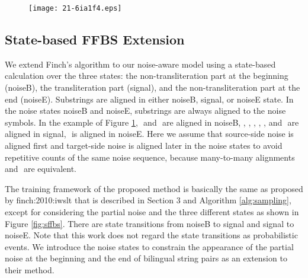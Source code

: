 \documentclass[english]{jnlp_1.4}
\def\subpair#1#2{}
\newcommand{\newcite}{}
\begin{document}
\begin{figure}[t]
\begin{center}
\texttt{[image: 21-6ia1f4.eps]}
\end{center}
\label{fig:alignment}
\end{figure}


\subsection{State-based FFBS Extension}

We extend Finch's algorithm to our noise-aware model
using a state-based calculation over the three states:
the non-transliteration part at the beginning ({\sf noiseB}),
the transliteration part ({\sf signal}),
and the non-transliteration part at the end ({\sf noiseE}).
Substrings are aligned in either {\sf noiseB}, {\sf signal}, or {\sf noiseE} state.
In the noise states {\sf noiseB} and {\sf noiseE}, substrings are always aligned to the noise symbols.
In the example of Figure {\ref{fig:alignment}},
{$\subpair{\mathit{noise}}{\text{the}}$} and {$\subpair{\mathit{noise}}{\mathsf{sp}}$} are aligned in {\sf noiseB},
{$\subpair{\text{エッチ}}{\text{etchi}}$}, {$\subpair{\text{ング}}{\text{ng}}$}, {$\subpair{\text{NULL}}{\mathsf{sp}}$}, {$\subpair{\text{マ}}{\text{ma}}$},
{$\subpair{\text{ス}}{\text{s}}$}, and {$\subpair{\text{ク}}{\text{k}}$} are aligned in {\sf signal},
{$\subpair{\mathit{noise}}{\text{s}}$} is aligned in {\sf noiseE}.
Here we assume that source-side noise is aligned first and target-side noise is aligned later in the noise states
to avoid repetitive counts of the same noise sequence,
because many-to-many alignments {$\subpair{\text{a b}}{\mathit{noise}} \subpair{\mathit{noise}}{\text{x y}}$}
and {$\subpair{\mathit{noise}}{\mathrm{x y}} \subpair{\mathrm{a b}}{\mathit{noise}}$} are equivalent.

The training framework of the proposed method is basically the same as proposed by \newcite{finch:2010:iwslt} that is described in Section 3
and Algorithm {\ref{alg:sampling}}, except for considering the partial noise and the three different states
as shown in Figure {\ref{fig:sffbs}}.
There are state transitions from {\sf noiseB} to {\sf signal} and {\sf signal} to {\sf noiseE}.
Note that this work does not regard the state transitions as probabilistic events.
We introduce the noise states to constrain the appearance of the partial noise
at the beginning and the end of bilingual string pairs as an extension to their method.
\end{document}
